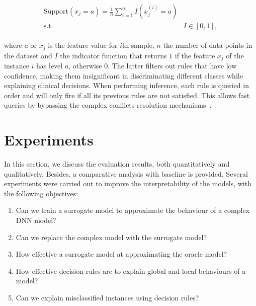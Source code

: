 \vspace{-6mm}
\begin{align}
    \begin{array}{cl}
        \text {Support}\left(x_{j}=a\right)=\frac{1}{n} \sum_{i=1}^{n} I\left(x_{j}^{(i)}=a\right) \\
         \text {s.t.} & I \in[0,1],
    \end{array}
    \label{eq:support_eq}
\end{align}

\hspace*{3.5mm} where $a$ or $x_j$ is the feature value for $i$th sample, $n$ the number of data points in the dataset and $I$ the indicator function that returns $1$ if the feature $x_{j}$ of the instance $i$ has level $a$, otherwise $0$. The latter filters out rules that have low confidence, making them insignificant in discriminating different classes while explaining clinical decisions. When performing inference, each rule is queried in order and will only fire if all its previous rules are not satisfied. This allows fast queries by bypassing the complex conflicts resolution mechanisms~\cite{ribeiro2018anchors}. 



\section{Experiments} \label{chapter_7:results}
In this section, we discuss the evaluation results, both quantitatively and qualitatively. Besides, a comparative analysis with baseline is provided. Several experiments were carried out to improve the interpretability of the models, with the following objectives: 

\begin{enumerate}[noitemsep]
    \item Can we train a surrogate model to approximate the behaviour of a complex DNN model? 
    \item Can we replace the complex model with the surrogate model? 
    \item How effective a surrogate model at approximating the oracle model?  
    \item How effective decision rules are to explain global and local behaviours of a model?   
    \item Can we explain misclassified instances using decision rules? 
\end{enumerate}


